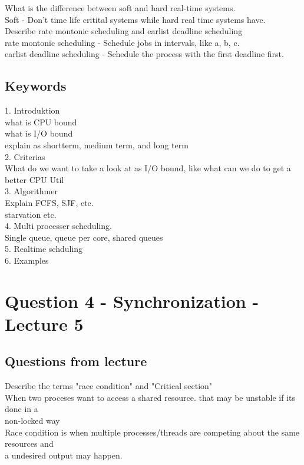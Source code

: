 \documentclass[a4paper,10pt,titlepage]{report}
\begin{document}
What is the difference between soft and hard real-time systems.\\
\hspace{10mm} Soft -  Don't time life critital systems while hard real time systems have.\\

Describe rate montonic scheduling and earlist deadline scheduling\\
\hspace{10mm} rate montonic scheduling - Schedule jobs in intervals, like a, b, c.\\
\hspace{10mm} earlist deadline scheduling - Schedule the process with the first deadline first.\\

\subsection{Keywords}
1. Introduktion\\
what is CPU bound\\
what is I/O bound\\
explain as shortterm, medium term, and long term\\
2. Criterias\\
What do we want to take a look at as I/O bound, like what can we do to get a better CPU Util\\
3. Algorithmer \\ 
Explain FCFS, SJF, etc.\\
starvation etc. \\
4. Multi processer scheduling.\\
Single queue, queue per core, shared queues\\
5. Realtime schduling\\

6. Examples\\
\newpage
\section{Question 4 - Synchronization - Lecture 5}

\subsection{Questions from lecture}

Describe the terms "race condition" and "Critical section"\\

\hspace{10mm} When two proceses want to access a shared resource. that may be unstable if its done in a \\ \hspace{10mm} non-locked way\\
\hspace{10mm} 
Race condition is when multiple processes/threads are competing about the same resources and \\ \hspace{10mm}  a undesired output may happen. \\
\end{document}
